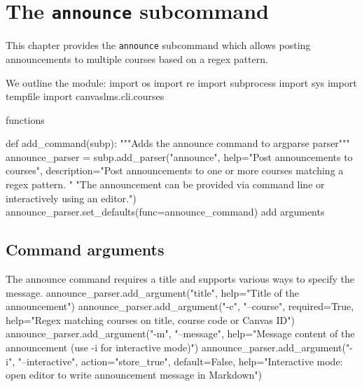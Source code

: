 \chapter{The \texttt{announce} subcommand}%

This chapter provides the \texttt{announce} subcommand which allows posting
announcements to multiple courses based on a regex pattern.

We outline the module:
\endmoddef\nwstartdeflinemarkup\nwenddeflinemarkup
import os
import re
import subprocess
import sys
import tempfile
import canvaslms.cli.courses

\LA{}functions~{\nwtagstyle{}}\RA{}

def add_command(subp):
  """Adds the announce command to argparse parser"""
  announce_parser = subp.add_parser("announce",
    help="Post announcements to courses",
    description="Post announcements to one or more courses matching a regex pattern. "
                "The announcement can be provided via command line or interactively using an editor.")
  announce_parser.set_defaults(func=announce_command)
  \LA{}add arguments~{\nwtagstyle{}}\RA{}
\nwendcode{}\nwdocspar


\section{Command arguments}

The announce command requires a title and supports various ways to specify the message.
\nwenddocs{}\endmoddef\nwstartdeflinemarkup{}\nwenddeflinemarkup
announce_parser.add_argument("title",
  help="Title of the announcement")
announce_parser.add_argument("-c", "--course", required=True,
  help="Regex matching courses on title, course code or Canvas ID")
announce_parser.add_argument("-m", "--message",
  help="Message content of the announcement (use -i for interactive mode)")
announce_parser.add_argument("-i", "--interactive",
  action="store_true", default=False,
  help="Interactive mode: open editor to write announcement message in Markdown")
\nwendcode{}\nwdocspar


